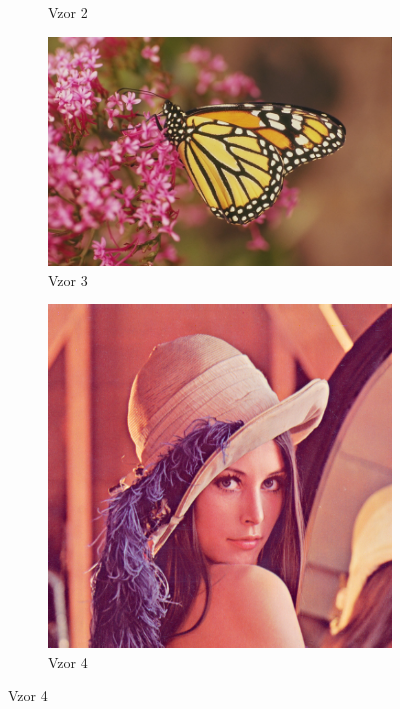 \documentclass[a4paper,11pt]{scrartcl}
\begin{document}
\begin{figure}[!h]
\begin{subfigure}[b]{0.4\textwidth}
        \caption{Vzor 2}
        \label{fig:gull}
    \end{subfigure}
    \begin{subfigure}[b]{0.4\textwidth}
        \includegraphics[width=\textwidth]{img/example3.png}
        \caption{Vzor 3}
        \label{fig:gull}
    \end{subfigure}
    \begin{subfigure}[b]{0.4\textwidth}
        \includegraphics[width=\textwidth]{img/example4.png}
        \caption{Vzor 4}
        \label{fig:gull}

\end{subfigure}
\end{figure}
\end{document}
